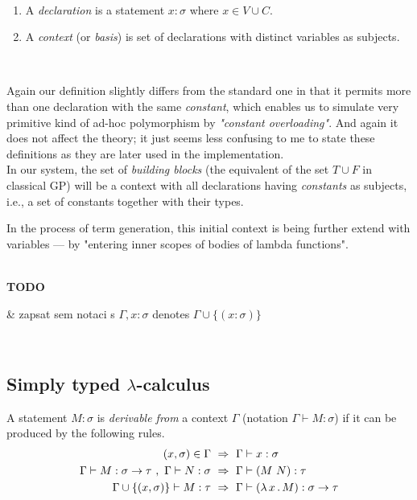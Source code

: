 \documentclass[12pt,a4paper]{report}
\newcommand{\tur}[3]{#1\vdash{}#2:#3}
\newcommand{\turst}[3]{$#1\vdash{}#2:#3$\xspace}
\newcommand{\GMS}{\turst{\Gamma}{M}{\sigma}}
\newenvironment{todo}
{ ~\\[0.5em]
  {\color{red}\textbf{TODO}}
  \begin{easylist}[itemize]}
{ \end{easylist}
  ~}
\begin{document}
\begin{definition}
~
\begin{enumerate}
 \item A \textit{declaration} is a statement 
 $x : \sigma$ where $x \in V \cup C$.
  
 \item A \textit{context} (or \textit{basis}) 
 is set of declarations with distinct variables as subjects.
\end{enumerate}~
\end{definition}
    

Again our definition slightly differs from the standard one
in that it permits more than one declaration with the same 
\textit{constant}, which enables us to simulate very primitive
kind of ad-hoc polymorphism by \textit{"constant overloading"}.  
And again it does not affect the theory; it just seems less
confusing to me to state these definitions as they are later 
used in the implementation.   \\

In our system, the set of \textit{building blocks} 
(the equivalent of the set $T \cup F$ in classical GP)
will be a context with all declarations having \textit{constants}
as subjects, i.e., a set of constants together with their types.

In the process of term generation, 
this initial context is being further extend with variables
 --- by "entering inner scopes of bodies of lambda functions".   
	


\begin{todo}
 & zapsat sem notaci s $\Gamma,x:\sigma $ denotes $ \Gamma\cup\{(x:\sigma)\}$ 
\end{todo}
		
\subsection{Simply typed $\lambda$-calculus}

\begin{definition}
A statement $M\colon\sigma$ is \textit{derivable from}
a context $\Gamma$ (notation $\Gamma\vdash{}M\colon\sigma$) 
if it can be produced by the following rules.
\begin{align*}
(x,\sigma) \in \Gamma &~\then~ \tur{\Gamma}{x}{\sigma}\\
\tur{\Gamma}{M}{\sigma \ar \tau}~,~\tur{\Gamma}{N}{\sigma} 
&~\then~ \tur{\Gamma}{(M~N)}{\tau}\\  
\tur{\Gamma \cup \{(x,\sigma)\}}{M}{\tau}
&~\then~ \tur{\Gamma}{\lamb{x}{M}}{\sigma \ar \tau} 
\end{align*}~
\end{definition}
\end{document}
